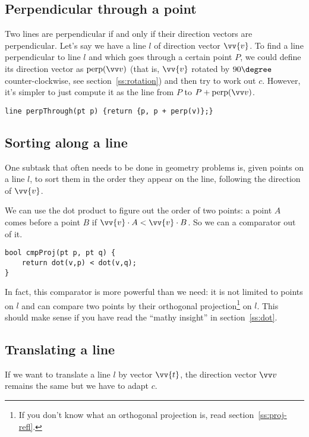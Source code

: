 \subsection{Perpendicular through a point}\label{perpThrough}
Two lines are perpendicular if and only if their direction vectors are perpendicular. Let's say we have a line $l$ of direction vector $\vv{v}$. To find a line perpendicular to line $l$ and which goes through a certain point $P$, we could define its direction vector as $\perpop(\dir)$ (that is, $\vv{v}$ rotated by $90\degree$ counter-clockwise, see section~\ref{ss:rotation}) and then try to work out $c$. However, it's simpler to just compute it as the line from $P$ to $P + \perpop(\dir)$.


\begin{lstlisting}
line perpThrough(pt p) {return {p, p + perp(v)};}
\end{lstlisting}

\subsection{Sorting along a line}\label{ss:sort-line}
One subtask that often needs to be done in geometry problems is, given points on a line $l$, to sort them in the order they appear on the line, following the direction of $\vv{v}$.%



We can use the dot product to figure out the order of two points: a point $A$ comes before a point $B$ if $\vv{v} \cdot A < \vv{v} \cdot B$. So we can a comparator out of it.
\begin{lstlisting}
bool cmpProj(pt p, pt q) {
    return dot(v,p) < dot(v,q);
}
\end{lstlisting}
In fact, this comparator is more powerful than we need: it is not limited to points on $l$ and can compare two points by their orthogonal projection\footnote{If you don't know what an orthogonal projection is, read section~\ref{ss:proj-refl}.} on $l$. This should make sense if you have read the ``mathy insight'' in section~\ref{ss:dot}.

\subsection{Translating a line}
If we want to translate a line $l$ by vector $\vv{t}$, the direction vector $\dir$ remains the same but we have to adapt $c$.

